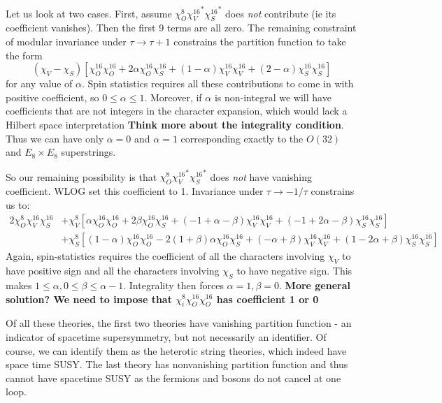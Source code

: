 \documentclass[11pt, class=article, crop=false]{standalone}
\begin{document}
\begin{enumerate}
\begin{enumerate}
	Let us look at two cases. First, assume $\chi^8_O {\chi_V^{16}}^* {\chi_S^{16}}^*$ does \emph{not} contribute (ie its coefficient vanishes). Then the first 9 terms are all zero. The remaining constraint of modular invariance under $\tau \to \tau+1$ constrains the partition function to take the form
	\[
		(\chi_V - \chi_S) \left[\chi^{16}_O \chi^{16}_O + 2 \alpha \chi^{16}_O \chi^{16}_S + (1-\alpha) \chi^{16}_V \chi^{16}_V + (2-\alpha) \chi^{16}_S \chi^{16}_S\right]
	\]
	for any value of $\alpha$. Spin statistics requires all these contributions to come in with positive coefficient, so $0 \leq \alpha \leq 1$. Moreover, if $\alpha$ is non-integral we will have coefficients that are not integers in the character expansion, which would lack a Hilbert space interpretation \textbf{Think more about the integrality condition}. Thus we can have only $\alpha = 0$ and $\alpha =1$ corresponding exactly to the $O(32)$ and $E_8 \times E_8$ superstrings. 
	
	So our remaining possibility is that $\chi^8_O {\chi_V^{16}}^* {\chi_S^{16}}^*$ does \emph{not} have vanishing coefficient. WLOG set this coefficient to 1. Invariance under $\tau \to -1/\tau$ constrains us to:
	\[
	\begin{aligned}
		2 \chi_O^8 \chi_V^{16} \chi_S^{16} &+ \chi_V^8 \left[\alpha \chi^{16}_O \chi^{16}_O + 2 \beta \chi^{16}_O \chi^{16}_S + (-1+\alpha-\beta) \chi^{16}_V \chi^{16}_V + (-1+2\alpha - \beta) \chi^{16}_S \chi^{16}_S\right]\\
		& + \chi_S^8 \left[(1-\alpha) \chi^{16}_O \chi^{16}_O - 2 (1+\beta) \alpha \chi^{16}_O \chi^{16}_S + (-\alpha + \beta) \chi^{16}_V \chi^{16}_V + (1-2\alpha +\beta) \chi^{16}_S \chi^{16}_S\right]
	\end{aligned}
	\]
	Again, spin-statistics requires the coefficient of all the characters involving $\chi_V$ to have positive sign and all the characters involving $\chi_S$ to have negative sign. This makes $1 \leq \alpha, 0 \leq \beta \leq \alpha -1$. Integrality then forces $\alpha = 1, \beta = 0$. \textbf{More general solution? We need to impose that $\chi_i^{8} \chi_O^{16} \chi_O^{16}$ has coefficient 1 or 0}
	\end{enumerate}
	Of all these theories, the first two theories have vanishing partition function - an indicator of spacetime supersymmetry, but not necessarily an identifier. Of course, we can identify them as the heterotic string theories, which indeed have space time SUSY. The last theory has nonvanishing partition function and thus cannot have spacetime SUSY as the fermions and bosons do not cancel at one loop.
	

\end{enumerate}
\end{document}
